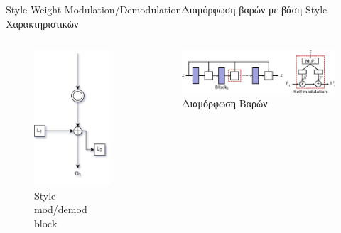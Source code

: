 \documentclass[10pt]{beamer}
\begin{document}
\begin{frame}{Style Weight Modulation/Demodulation}{Διαμόρφωση βαρών με βάση Style Χαρακτηριστικών}

\begin{columns}
        \begin{figure}
            \centering
            \includegraphics[height=0.4\textheight]{images/StylemodBlock.jpg}
            \caption{Style mod/demod block}
            \label{fig:enter-label}
        \end{figure}
        \begin{figure}
            \centering
            \includegraphics[height=0.15\textheight]{images/self-modulationMLPS.jpg}
            \caption{Διαμόρφωση Βαρών}
        \end{figure}
\end{columns}
\end{frame}
\end{document}
